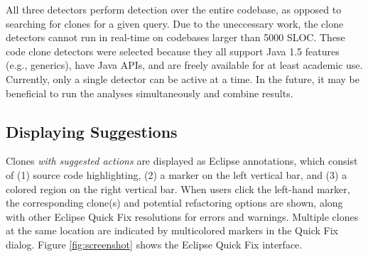 \documentclass[nocopyrightspace,10pt]{sigplanconf}
\begin{document}
All three detectors perform detection over the entire codebase, as
opposed to searching for clones for a given query. Due to the
uneccessary work, the clone detectors cannot run in real-time on codebases
larger than 5000 SLOC.
These code clone detectors were selected because they all support Java
1.5 features (e.g., generics), have Java APIs, and are freely
available for at least academic use. 
Currently, only a single detector can be active at a time. In the
future, it may be beneficial to run the analyses simultaneously and
combine results.





\subsection{Displaying Suggestions}
\label{sec:display}
Clones \emph{with suggested actions} are displayed as Eclipse
annotations, which consist of (1) source code highlighting, (2) a
marker on the left vertical bar, and (3) a colored region on the right
vertical bar.
When users click the left-hand marker,
the corresponding clone(s) and potential refactoring options are shown,
along with other Eclipse Quick Fix resolutions for errors and warnings.
Multiple clones at the same location are indicated by multicolored markers
in the Quick Fix dialog.
Figure \ref{fig:screenshot} shows the Eclipse Quick Fix interface.
\end{document}
